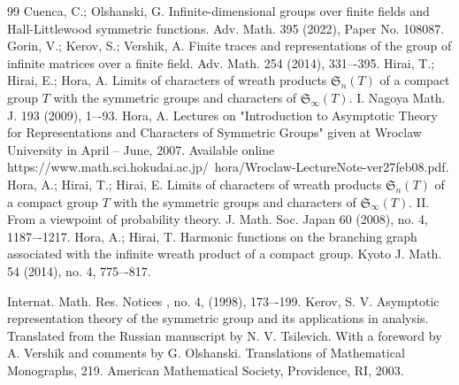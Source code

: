 \documentclass[12pt]{amsart}
\theoremstyle{definition}
\numberwithin{equation}{section}
\begin{document}
\begin{thebibliography}{99}
 Cuenca, C.; Olshanski, G. Infinite-dimensional groups over finite fields and Hall-Littlewood symmetric functions. Adv. Math. 395 (2022), Paper No. 108087.
 Gorin, V.; Kerov, S.; Vershik, A. Finite traces and representations of the group of infinite matrices over a finite field. Adv. Math. 254 (2014), 331–-395.
 Hirai, T.; Hirai, E.; Hora, A. Limits of characters of wreath products $\mathfrak{S}_n(T)$ of a compact group $T$ with the symmetric groups and characters of $\mathfrak{S}_{\infty}(T)$. I. Nagoya Math. J. 193 (2009), 1–-93.
 Hora, A.  Lectures on "Introduction to Asymptotic Theory for Representations and Characters of Symmetric Groups" given at Wroclaw University in April -- June, 2007. Available online
 https://www.math.sci.hokudai.ac.jp/~hora/Wroclaw-LectureNote-ver27feb08.pdf.
 Hora, A.; Hirai, T.; Hirai, E. Limits of characters of wreath products $\mathfrak{S}_n(T)$ of a compact group $T$ with the symmetric groups and characters of
$\mathfrak{S}_{\infty}(T)$. II. From a viewpoint of probability theory. J. Math. Soc. Japan 60 (2008), no. 4, 1187–-1217.
 Hora, A.; Hirai, T. Harmonic functions on the branching graph associated with the infinite wreath product of a compact group. Kyoto J. Math. 54 (2014), no. 4, 775–-817.


Internat. Math. Res. Notices , no. 4, (1998), 173–-199.
  Kerov, S. V. Asymptotic representation theory of the symmetric group and its applications in analysis. Translated from the Russian manuscript by N. V. Tsilevich. With a foreword by A. Vershik and comments by G. Olshanski. Translations of Mathematical Monographs, 219. American Mathematical Society, Providence, RI, 2003.


\end{thebibliography}
\end{document}
